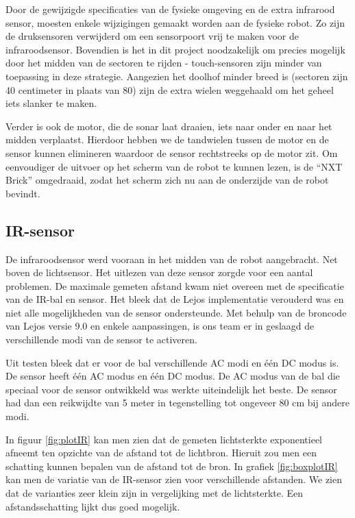 \documentclass[12pt,a4paper]{report}
\begin{document}
Door de gewijzigde specificaties van de fysieke omgeving en de extra infrarood sensor, moesten enkele wijzigingen gemaakt worden aan de fysieke robot. Zo zijn de druksensoren verwijderd om een sensorpoort vrij te maken voor de infraroodsensor. Bovendien is het in dit project noodzakelijk om precies mogelijk door het midden van de sectoren te rijden - touch-sensoren zijn minder van toepassing in deze strategie. Aangezien het doolhof minder breed is (sectoren zijn 40 centimeter in plaats van 80) zijn de extra wielen weggehaald om het geheel iets slanker te maken.

Verder is ook de motor, die de sonar laat draaien, iets naar onder en naar het midden verplaatst. Hierdoor hebben we de tandwielen tussen de motor en de sensor kunnen elimineren waardoor de sensor rechtstreeks op de motor zit. Om eenvoudiger de uitvoer op het scherm van de robot te kunnen lezen, is de ``NXT Brick'' omgedraaid, zodat het scherm zich nu aan de onderzijde van de robot bevindt.

\subsection{IR-sensor}

De infraroodsensor werd vooraan in het midden van de robot aangebracht. Net boven de lichtsensor. Het uitlezen van deze sensor zorgde voor een aantal problemen. De maximale gemeten afstand kwam niet overeen met de specificatie van de IR-bal en sensor. Het bleek dat de Lejos implementatie verouderd was en niet alle mogelijkheden van de sensor ondersteunde. Met behulp van de broncode van Lejos versie 9.0 en enkele aanpassingen, is ons team er in geslaagd de verschillende modi van de sensor te activeren.

Uit testen bleek dat er voor de bal verschillende AC modi en \'e\'en DC modus is. De sensor heeft \'e\'en AC modus en \'e\'en DC modus. De AC modus van de bal die speciaal voor de sensor ontwikkeld was werkte uiteindelijk het beste. De sensor had dan een reikwijdte van 5 meter in tegenstelling tot ongeveer 80 cm bij andere modi.

In figuur \ref{fig:plotIR} kan men zien dat de gemeten lichtsterkte exponentieel afneemt ten opzichte van de afstand tot de lichtbron.
Hieruit zou men een schatting kunnen bepalen van de afstand tot de bron. In grafiek \ref{fig:boxplotIR} kan men de variatie van de IR-sensor zien voor verschillende afstanden. We zien dat de varianties zeer klein zijn in vergelijking met de lichtsterkte. Een afstandsschatting lijkt dus goed mogelijk.
\end{document}
